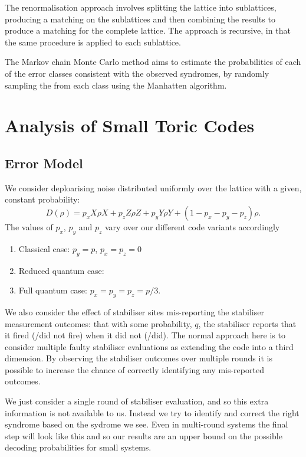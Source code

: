 The renormalisation approach involves splitting the lattice into sublattices, producing a matching on the sublattices and then combining the results to produce a matching for the complete lattice. The approach is recursive, in that the same procedure is applied to each sublattice. 

The Markov chain Monte Carlo method aims to estimate the probabilities of each of the error classes consistent with the observed syndromes, by randomly sampling the from each class using the Manhatten algorithm. 


\section{Analysis of Small Toric Codes}


\subsection{Error Model}

We consider deploarising noise distributed uniformly over the lattice with a given, constant probability:
\begin{equation} \label{noise_eq}
  D(\rho) = p_x X\rho X +  p_z Z\rho Z + p_y Y\rho Y  + (1- p_x - p_y - p_z)\rho.
\end{equation}
The values of $p_x$, $p_y$ and $p_z$ vary over our different code variants accordingly
\begin{enumerate}
  \item Classical case: $p_y = p$, $p_x = p_z = 0$
  \item Reduced quantum case:
  \item Full quantum case: $p_x = p_y = p_z = p/3$.
\end{enumerate}

We also consider the effect of stabiliser sites mis-reporting the stabiliser measurement outcomes: that with some probability, $q$, the stabiliser reports that it fired (/did not fire) when it did not (/did). The normal approach here is to consider multiple faulty stabiliser evaluations as extending the code into a third dimension. By observing the stabiliser outcomes over multiple rounds it is possible to increase the chance of correctly identifying any mis-reported outcomes.

We just consider a single round of stabiliser evaluation, and so this extra information is not available to us. Instead we try to identify and correct the right syndrome based on the sydrome we see. Even in multi-round systems the final step will look like this and so our results are an upper bound on the possible decoding probabilities for small systems.

